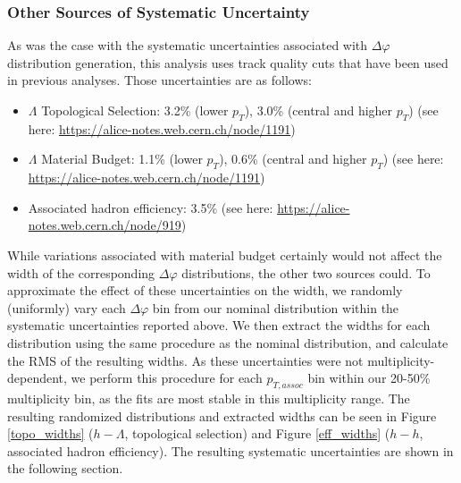 \documentclass[ALICE,manyauthors]{ALICE_analysis_notes}
\begin{document}
\clearpage


\subsubsection{Other Sources of Systematic Uncertainty}
\label{other_systematic_sources_width}
As was the case with the systematic uncertainties associated with $\Delta\varphi$ distribution generation, this analysis uses track quality cuts that have been used in previous analyses. Those uncertainties are as follows:

\begin{itemize}
\item $\Lambda$ Topological Selection: 3.2\% (lower $p_{T}$), 3.0\% (central and higher $p_{T}$) (see here: \url{https://alice-notes.web.cern.ch/node/1191})
\item $\Lambda$ Material Budget: 1.1\% (lower $p_{T}$), 0.6\% (central and higher $p_{T}$) (see here: \url{https://alice-notes.web.cern.ch/node/1191})
\item Associated hadron efficiency: 3.5\% (see here: \url{https://alice-notes.web.cern.ch/node/919})
\end{itemize}

While variations associated with material budget certainly would not affect the width of the corresponding $\Delta\varphi$ distributions, the other two sources could. To approximate the effect of these uncertainties on the width, we randomly (uniformly) vary each $\Delta\varphi$ bin from our nominal distribution within the systematic uncertainties reported above. We then extract the widths for each distribution using the same procedure as the nominal distribution, and calculate the RMS of the resulting widths. As these uncertainties were not multiplicity-dependent, we perform this procedure for each $p_{T, assoc}$ bin within our 20-50\% multiplicity bin, as the fits are most stable in this multiplicity range. The resulting randomized distributions and extracted widths can be seen in Figure \ref{topo_widths} ($h-\Lambda$, topological selection) and Figure \ref{eff_widths} ($h-h$, associated hadron efficiency). The resulting systematic uncertainties are shown in the following section.
\end{document}
